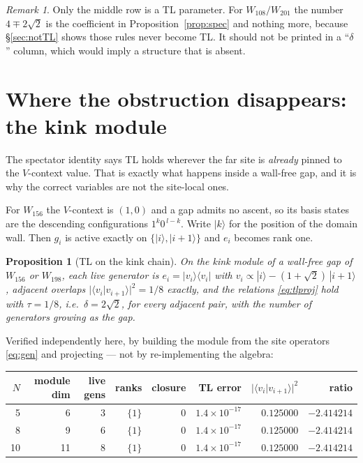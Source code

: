 \documentclass[11pt]{article}
\theoremstyle{plain}
\newtheorem{proposition}{Proposition}
\theoremstyle{remark}
\newtheorem{remark}{Remark}
\begin{document}
\begin{remark}
Only the middle row is a TL parameter. For $W_{108}/W_{201}$ the number
$4\mp2\sqrt2$ is the coefficient in Proposition~\ref{prop:spec} and nothing more,
because \S\ref{sec:notTL} shows those rules never become TL. It should not be
printed in a ``$\delta$'' column, which would imply a structure that is absent.
\end{remark}

\section{Where the obstruction disappears: the kink module}
\label{sec:kink}

The spectator identity says TL holds wherever the far site is \emph{already}
pinned to the $V$-context value. That is exactly what happens inside a wall-free
gap, and it is why the correct variables are not the site-local ones.

For $W_{156}$ the $V$-context is $(1,0)$ and a gap admits no ascent, so its basis
states are the descending configurations $1^k 0^{\,l-k}$. Write $|k\rangle$ for
the position of the domain wall. Then $g_i$ is active exactly on
$\{|i\rangle, |i+1\rangle\}$ and $e_i$ becomes rank one.

\begin{proposition}[TL on the kink chain]
\label{prop:kink}
On the kink module of a wall-free gap of $W_{156}$ or $W_{198}$, each live
generator is $e_i = |v_i\rangle\langle v_i|$ with
$v_i \propto |i\rangle - (1+\sqrt2)\,|i+1\rangle$, adjacent overlaps
$|\langle v_i|v_{i+1}\rangle|^2 = 1/8$ exactly, and the relations
\eqref{eq:tlproj} hold with $\tau = 1/8$, i.e.\ $\delta = 2\sqrt2$, for
\emph{every} adjacent pair, with the number of generators growing as the gap.
\end{proposition}

\noindent Verified independently here, by building the module from the site
operators \eqref{eq:gen} and projecting --- not by re-implementing the algebra:

\begin{center}
\begin{tabular}{rrrrrrrr}
\toprule
$N$ & module dim & live gens & ranks & closure & TL error & $|\langle v_i|v_{i+1}\rangle|^2$ & ratio \\
\midrule
5  & 6  & 3 & $\{1\}$ & $0$ & $1.4\times10^{-17}$ & $0.125000$ & $-2.414214$ \\
8  & 9  & 6 & $\{1\}$ & $0$ & $1.4\times10^{-17}$ & $0.125000$ & $-2.414214$ \\
10 & 11 & 8 & $\{1\}$ & $0$ & $1.4\times10^{-17}$ & $0.125000$ & $-2.414214$ \\
\bottomrule
\end{tabular}
\end{center}
\end{document}
